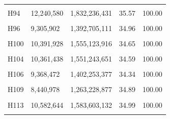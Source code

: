 \documentclass[
  a4paper,
  titlepage]{article}
\begin{document}
\begin{longtable}[t]{lllll}
\cellcolor{gray!6}{H93} & \cellcolor{gray!6}{7,629,038} & \cellcolor{gray!6}{1,141,510,656} & \cellcolor{gray!6}{34.68} & \cellcolor{gray!6}{100.00}\\
 
H94 & 12,240,580 & 1,832,236,431 & 35.57 & 100.00\\
 
\cellcolor{gray!6}{H95} & \cellcolor{gray!6}{8,459,492} & \cellcolor{gray!6}{1,265,016,542} & \cellcolor{gray!6}{34.69} & \cellcolor{gray!6}{100.00}\\
 
H96 & 9,305,902 & 1,392,705,111 & 34.96 & 100.00\\
 
\cellcolor{gray!6}{H97} & \cellcolor{gray!6}{8,313,474} & \cellcolor{gray!6}{1,244,227,080} & \cellcolor{gray!6}{35.06} & \cellcolor{gray!6}{100.00}\\
 
H100 & 10,391,928 & 1,555,123,916 & 34.65 & 100.00\\
 
\cellcolor{gray!6}{H102} & \cellcolor{gray!6}{9,889,248} & \cellcolor{gray!6}{1,479,620,961} & \cellcolor{gray!6}{34.71} & \cellcolor{gray!6}{100.00}\\
 
H104 & 10,361,438 & 1,551,243,651 & 34.59 & 100.00\\
 
\cellcolor{gray!6}{H105} & \cellcolor{gray!6}{7,441,408} & \cellcolor{gray!6}{1,113,612,931} & \cellcolor{gray!6}{35.04} & \cellcolor{gray!6}{100.00}\\
 
H106 & 9,368,472 & 1,402,253,377 & 34.34 & 100.00\\
 
\cellcolor{gray!6}{H108} & \cellcolor{gray!6}{8,311,702} & \cellcolor{gray!6}{1,243,758,434} & \cellcolor{gray!6}{34.27} & \cellcolor{gray!6}{100.00}\\
 
H109 & 8,440,978 & 1,263,228,877 & 34.89 & 100.00\\
 
\cellcolor{gray!6}{H112} & \cellcolor{gray!6}{12,160,434} & \cellcolor{gray!6}{1,820,135,470} & \cellcolor{gray!6}{35.61} & \cellcolor{gray!6}{100.00}\\
 
H113 & 10,582,644 & 1,583,603,132 & 34.99 & 100.00\\
 
\cellcolor{gray!6}{H115} & \cellcolor{gray!6}{11,783,496} & \cellcolor{gray!6}{1,763,218,331} & \cellcolor{gray!6}{34.73} & \cellcolor{gray!6}{100.00}\\
 

\end{longtable}
\end{document}

